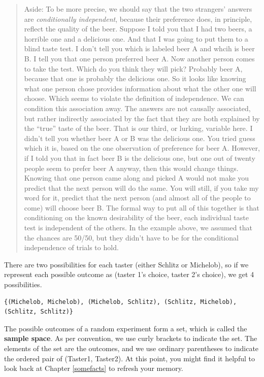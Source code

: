 \documentclass[
  openany]{book}
\begin{document}
\begin{quote}
Aside: To be more precise, we should say that the two strangers' answers are \emph{conditionally independent}, because their preference does, in principle, reflect the quality of the beer. Suppose I told you that I had two beers, a horrible one and a delicious one. And that I was going to put them to a blind taste test. I don't tell you which is labeled beer A and whcih is beer B. I tell you that one person preferred beer A. Now another person comes to take the test. Which do you think they will pick? Probably beer A, because that one is probably the delicious one. So it looks like knowing what one person chose provides information about what the other one will choose. Which seems to violate the definition of independence. We can condition this association away. The answers are not causally associated, but rather indirectly associated by the fact that they are both explained by the ``true'' taste of the beer. That is our third, or lurking, variable here. I didn't tell you whether beer A or B was the delicious one. You tried guess which it is, based on the one observation of preference for beer A. However, if I told you that in fact beer B is the delicious one, but one out of twenty people seem to prefer beer A anyway, then this would change things. Knowing that one person came along and picked A would not make you predict that the next person will do the same. You will still, if you take my word for it, predict that the next person (and almost all of the people to come) will choose beer B. The formal way to put all of this together is that conditioning on the known desirability of the beer, each individual taste test is independent of the others. In the example above, we assumed that the chances are 50/50, but they didn't have to be for the conditional independence of trials to hold.
\end{quote}

There are two possibilities for each taster (either Schlitz or Michelob), so if we represent each possible outcome as (taster 1's choice, taster 2's choice), we get 4 possibilities.

\begin{verbatim}
{(Michelob, Michelob), (Michelob, Schlitz), (Schlitz, Michelob), (Schlitz, Schlitz)}
\end{verbatim}

The possible outcomes of a random experiment form a set, which is called the \textbf{sample space}. As per convention, we use curly brackets to indicate the set. The elements of the set are the outcomes, and we use ordinary parentheses to indicate the ordered pair of (Taster1, Taster2). At this point, you might find it helpful to look back at Chapter \ref{somefacts} to refresh your memory.
\end{document}
